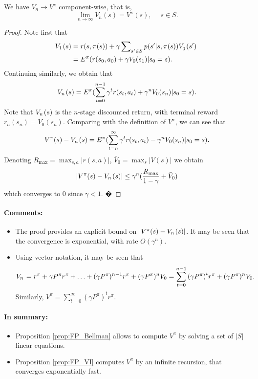 \begin{proposition}\label{prop:FP_VI}
We have ${V_n} \to V_{}^\pi$ component-wise, that is,
\[{\lim _{n \to \infty }}{V_n}(s) = V_{}^\pi (s),\quad \;s \in S.\]
\end{proposition}
\begin{proof}
Note first that
\begin{align*}
{V_1}{\kern 1pt} (s) &= r(s,\pi (s)) + \gamma \sum\nolimits_{s' \in S} {p(s'|s,\pi (s))V_0^{}{\kern 1pt} (s')} \;\\
 &= {E^\pi }(r({s_0},{a_0}) + \gamma {V_0}({s_1})|{s_0} = s).
\end{align*}
Continuing similarly, we obtain that
\[{V_n}{\kern 1pt} (s) = {E^\pi }(\sum\limits_{t = 0}^{n - 1} {{\gamma ^t}r({s_t},{a_t})}  + {\gamma ^n}{V_0}({s_n})|{s_0} = s).\]
Note that ${V_n}{\kern 1pt} (s)$ is the $n$-stage discounted return, with terminal reward ${r_n}({s_n}) = {V_0}({s_n})$. Comparing with the definition of $V_{}^\pi $, we can see that
\[{V^\pi }(s) - {V_n}{\kern 1pt} (s) = {E^\pi }(\sum\limits_{t = n}^\infty  {{\gamma ^t}r({s_t},{a_t})}  - {\gamma ^n}{V_0}({s_n})|{s_0} = s).\]
Denoting ${R_{\max }} = {\max _{s,a}}|r(s,a)|$, ${\bar V_0} = {\max _s}|V(s)|$ we obtain
\[|{V^\pi }(s) - {V_n}{\kern 1pt} (s)| \le {\gamma ^n}(\frac{{{R_{\max }}}}{{1 - \gamma }} + {\bar V_0})\]
which converges to 0 since $\gamma  < 1$.                                                                                    �
\end{proof}

\paragraph{Comments:}
\begin{itemize}
  \item The proof provides an explicit bound on $|{V^\pi }(s) - {V_n}{\kern 1pt} (s)|$. It may be seen that the convergence is exponential, with rate $O({\gamma ^n})$.
  \item Using vector notation, it may be seen that
          \[{V_n}{\kern 1pt}  = {r^\pi } + {\gamma}{P^\pi }{r^\pi } +  \ldots  + {({\gamma}{P^\pi })^{n - 1}}{r^\pi } + {({\gamma}{P^\pi })^n}{V_0} = \sum\limits_{t = 0}^{n - 1} {{{({\gamma}{P^\pi })}^t}{r^\pi }}  + {({\gamma}{P^\pi })^n}{V_0}.\]
Similarly,    ${V^\pi } = \sum\limits_{t = 0}^\infty  {{{({\gamma}{P^\pi })}^t}{r^\pi }}$.
\end{itemize}

\paragraph{In summary:}
\begin{itemize}
  \item Proposition \ref{prop:FP_Bellman} allows to compute $V_{}^\pi $ by solving a set of $|S|$ linear equations.
  \item Proposition \ref{prop:FP_VI} computes $V_{}^\pi $ by an infinite recursion, that converges exponentially fast.
\end{itemize}

